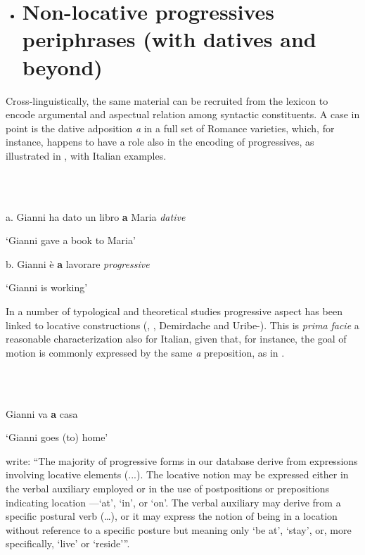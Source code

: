 \documentclass[output=paper]{langsci/langscibook}
\begin{document}
\begin{itemize}
\item \section{Non-locative progressives periphrases (with datives and beyond)}
\end{itemize}

Cross-linguistically, the same material can be recruited from the lexicon to encode argumental and aspectual relation among syntactic constituents. A case in point is the dative adposition \textit{a} in a full set of Romance varieties, which, for instance, happens to have a role also in the encoding of progressives, as illustrated in , with Italian examples.

\ea%
    \label{ex:key:10}
    \gll\\
        \\
    \glt
    \z

           a.  Gianni ha dato un libro \textbf{a} Maria    \textit{dative}

    ‘Gianni gave a book to Maria’

b.  Gianni è \textbf{a} lavorare         \textit{progressive}

  ‘Gianni is working’

In a number of typological and theoretical studies progressive aspect has been linked to locative constructions (\citealt{BybeeEtAl1994}, \citealt{MateuAmadas1999}, Demirdache and Uribe-\citealt{Etxebarria1997}).  This is \textit{prima} \textit{facie} a reasonable characterization also for Italian, given that, for instance, the goal of motion is commonly expressed by the same \textit{a} preposition, as in .

\ea%
    \label{ex:key:11}
    \gll\\
        \\
    \glt
    \z

           Gianni va \textbf{a} casa

  ‘Gianni goes (to) home’

\citet[129-130]{BybeeEtAl1994} write: “The majority of progressive forms in our database derive from expressions involving locative elements (...). The locative notion may be expressed either in the verbal auxiliary employed or in the use of postpositions or prepositions indicating location —‘at’, ‘in’, or ‘on’. The verbal auxiliary may derive from a specific postural verb (…), or it may express the notion of being in a location without reference to a specific posture but meaning only ‘be at’, ‘stay’, or, more specifically, ‘live’ or ‘reside’”.
\end{document}
